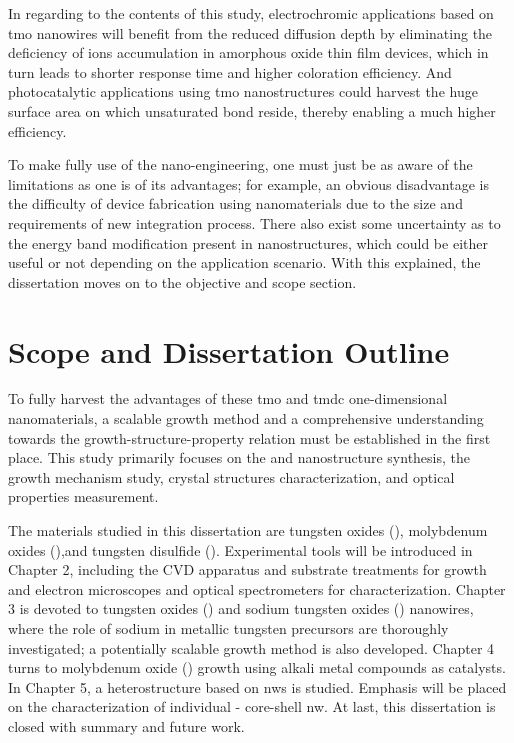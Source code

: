 In regarding to the contents of this study, electrochromic applications based on \gls{tmo} nanowires will benefit from the reduced diffusion depth by eliminating the deficiency of ions accumulation in amorphous oxide thin film devices, which in turn leads to shorter response time and higher coloration efficiency.\cite{Huang2008a,Scherer2012} And photocatalytic applications using \gls{tmo} nanostructures could harvest the huge surface area on which unsaturated bond reside, thereby enabling a much higher efficiency.\cite{Mills1993,Merki2011,Chen2011b}

To make fully use of the nano-engineering, one must just be as aware of the limitations as one is of its advantages; for example, an obvious disadvantage is the difficulty of device fabrication using nanomaterials due to the size and requirements of new integration process. There also exist some uncertainty as to the energy band modification present in nanostructures, which could be either useful or not depending on the application scenario.\cite{Wang2012} With this explained, the dissertation moves on to the objective and scope section. 

\section{Scope and Dissertation Outline}
To fully harvest the advantages of these \gls{tmo} and \gls{tmdc} one-dimensional nanomaterials, a scalable growth method and a comprehensive understanding towards the growth-structure-property relation must be established in the first place. This study primarily focuses on the  and  nanostructure synthesis, the growth mechanism study, crystal structures characterization, and optical properties measurement.

The materials studied in this dissertation are tungsten oxides (), molybdenum oxides (),and tungsten disulfide (). Experimental tools will be introduced in Chapter 2, including the CVD apparatus and substrate treatments for growth and electron microscopes and optical spectrometers for characterization. Chapter 3 is devoted to tungsten oxides () and sodium tungsten oxides () nanowires, where the role of sodium in metallic tungsten precursors are thoroughly investigated; a potentially scalable growth method is also developed. Chapter 4 turns to molybdenum oxide () growth using alkali metal compounds as catalysts. In Chapter 5, a heterostructure based on  \glspl{nw} is studied. Emphasis will be placed on the characterization of individual - core-shell \gls{nw}. At last, this dissertation is closed with summary and future work. 
